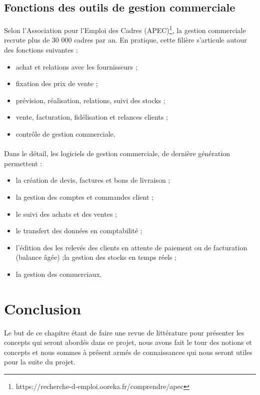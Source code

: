 \subsection{Fonctions des outils de gestion commerciale}
Selon l’Association pour l'Emploi des Cadres (APEC)\footnote{https://recherche-d-emploi.ooreka.fr/comprendre/apec}, la gestion commerciale recrute plus de 30 000 cadres par an. En pratique, cette filière s’articule autour des fonctions suivantes :
\begin{itemize}
    \item achat et relations avec les fournisseurs ;
    \item fixation des prix de vente ;
    \item prévision, réalisation, relations, suivi des stocks ;
    \item vente, facturation, fidélisation et relances clients ;
    \item contrôle de gestion commerciale.
\end{itemize}
\paragraph{}
Dans le détail, les logiciels de gestion commerciale, de dernière génération permettent :
\begin{itemize}
    \item la création de devis, factures et bons de livraison ;
    \item la gestion des comptes et commandes client ;
    \item le suivi des achats et des ventes ;
    \item le transfert des données en comptabilité ;
    \item l’édition des les relevés des clients en attente de paiement ou de facturation (balance âgée) ;la gestion des stocks en temps réels ;
    \item la gestion des commerciaux.
\end{itemize}




 



\section*{Conclusion}%
%
Le but de ce chapitre étant de faire une revue de littérature pour présenter les concepts qui seront abordés dans ce projet, nous avons fait le tour des notions et concepts et nous sommes à présent armés de connaissances qui nous seront utiles pour la suite du projet.
